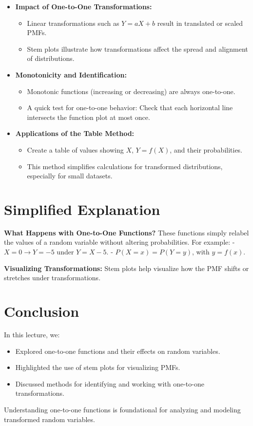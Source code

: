 \documentclass{article}
\begin{document}
\begin{itemize}
  \item \textbf{Impact of One-to-One Transformations:}
    \begin{itemize}
      \item Linear transformations such as $Y = aX + b$ result in translated or scaled PMFs.
      \item Stem plots illustrate how transformations affect the spread and alignment of distributions.
    \end{itemize}

  \item \textbf{Monotonicity and Identification:}
    \begin{itemize}
      \item Monotonic functions (increasing or decreasing) are always one-to-one.
      \item A quick test for one-to-one behavior: Check that each horizontal line intersects the function plot at most once.
    \end{itemize}

  \item \textbf{Applications of the Table Method:}
    \begin{itemize}
      \item Create a table of values showing $X$, $Y = f(X)$, and their probabilities.
      \item This method simplifies calculations for transformed distributions, especially for small datasets.
    \end{itemize}
\end{itemize}

\section*{Simplified Explanation}

\textbf{What Happens with One-to-One Functions?}
These functions simply relabel the values of a random variable without altering probabilities. For example:
- $X = 0 \to Y = -5$ under $Y = X - 5$.
- $P(X = x) = P(Y = y)$, with $y = f(x)$.

\textbf{Visualizing Transformations:}
Stem plots help visualize how the PMF shifts or stretches under transformations.

\section*{Conclusion}

In this lecture, we:
\begin{itemize}
  \item Explored one-to-one functions and their effects on random variables.
  \item Highlighted the use of stem plots for visualizing PMFs.
  \item Discussed methods for identifying and working with one-to-one transformations.
\end{itemize}

Understanding one-to-one functions is foundational for analyzing and modeling transformed random variables.
\end{document}

